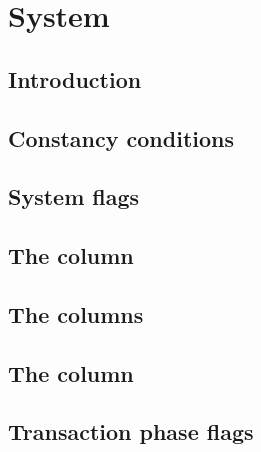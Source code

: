 \section{System}
\subsection{Introduction                         \lispNone{}}   \label{hub: system: intro}                     
\subsection{Constancy conditions                 \lispDone{}}   \label{hub: system: constancy conditions}      
\subsection{System flags                         \lispTodo{}}   \label{hub: system: system flags}              
\subsection{The \blockNumber{} column            \lispTodo{}}   \label{hub: system: block number}              
\subsection{The \xxxxTransactionNumber{} columns \lispTodo{}}   \label{hub: system: transaction numbers}       
\subsection{The \hubStamp{} column               \lispTodo{}}   \label{hub: system: hub stamp}                 
\subsection{Transaction phase flags              \lispTodo{}}   \label{hub: system: transaction phase flags}   
